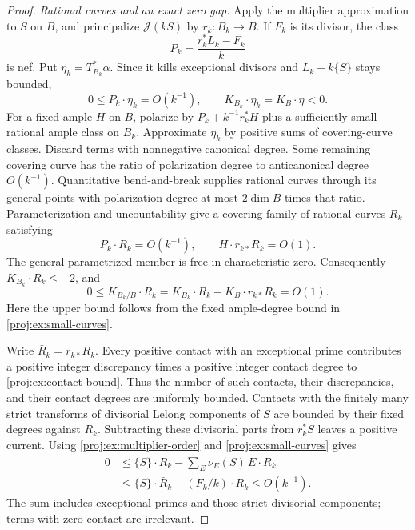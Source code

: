 \documentclass[11pt,letterpaper]{article}
\theoremstyle{definition}
\theoremstyle{remark}
\begin{document}
\begin{proof}
\smallskip
\noindent\emph{Rational curves and an exact zero gap.}
Apply the multiplier approximation to \(S\) on \(B\), and
principalize \(\mathcal J(kS)\) by \(r_k:B_k\to B\).
If \(F_k\) is its divisor, the class
\[
 P_k=\frac{r_k^*L_k-F_k}{k}
\]
is nef. Put \(\eta_k=T_{B_k}^*\alpha\). Since it kills
exceptional divisors and \(L_k-k\{S\}\) stays bounded,
\[
 0\leq P_k\cdot\eta_k=O(k^{-1}),\qquad
 K_{B_k}\cdot\eta_k=K_B\cdot\eta<0.
\]
For a fixed ample \(H\) on \(B\), polarize by
\(P_k+k^{-1}r_k^*H\) plus a sufficiently small rational ample
class on \(B_k\). Approximate \(\eta_k\) by positive sums of
covering-curve classes. Discard terms with nonnegative
canonical degree. Some remaining covering curve has the ratio
of polarization degree to anticanonical degree \(O(k^{-1})\).
Quantitative bend-and-break
\cite[Theorem~5]{Proj-MiyaokaMori1986} supplies rational curves
through its general points with polarization degree at most
\(2\dim B\) times that ratio. Parameterization and
uncountability give a covering family of rational curves
\(R_k\) satisfying
\begin{equation}\label{proj:ex:small-curves}
 P_k\cdot R_k=O(k^{-1}),\qquad
 H\cdot r_{k*}R_k=O(1).
\end{equation}
The general parametrized member is free in characteristic
zero. Consequently \(K_{B_k}\cdot R_k\leq-2\), and
\begin{equation}\label{proj:ex:contact-bound}
 0\leq K_{B_k/B}\cdot R_k
   =K_{B_k}\cdot R_k-K_B\cdot r_{k*}R_k=O(1).
\end{equation}
Here the upper bound follows from the fixed ample-degree
bound in \eqref{proj:ex:small-curves}.

Write \(\bar R_k=r_{k*}R_k\). Every positive contact with an
exceptional prime contributes a positive integer discrepancy
times a positive integer contact degree to
\eqref{proj:ex:contact-bound}. Thus the number of such contacts,
their discrepancies, and their contact degrees are uniformly
bounded. Contacts with the finitely many strict transforms
of divisorial Lelong components of \(S\) are bounded by their
fixed degrees against \(\bar R_k\). Subtracting these
divisorial parts from \(r_k^*S\) leaves a positive current.
Using \eqref{proj:ex:multiplier-order} and
\eqref{proj:ex:small-curves} gives
\begin{equation}\label{proj:ex:zero-gap}
 \begin{split}
 0&\leq \{S\}\cdot\bar R_k
          -\sum_E\nu_E(S)\,E\cdot R_k\\
  &\leq \{S\}\cdot\bar R_k-(F_k/k)\cdot R_k
   \leq O(k^{-1}).
 \end{split}
\end{equation}
The sum includes exceptional primes and those strict
divisorial components; terms with zero contact are irrelevant.


\end{proof}
\end{document}
